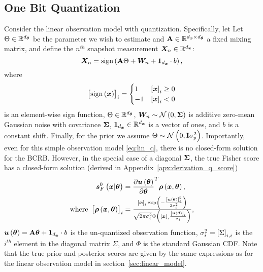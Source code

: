 {\subsection{%
{One Bit }Quantization}\label{sec:quantization_example}
Consider the linear observation model with quantization. %
{Specifically, let Let $\Theta\in\mathbb{R}^{{d_{\bm{\theta}}}}$ be the parameter %
{we wish to estimate} and $\mathbf{A}\in\mathbb{R}^{{{d_{\bm{x}}}}\times {d_{\bm{\theta}}}}$  a fixed mixing matrix, %
and define the  ${n}^{th}$ snapshot measurement ${\X}_{n}\in\mathbb{R}^{{\nx}}$:} %
\begin{equation}\label{eq:lin_q}
{\X}_{n}=\mathrm{sign}\brackets{\matsym{A}\pr+\randomvec{W}_{n}+\boldsymbol{1}_{\nx}\cdot b },
\end{equation}
where %
{$$\left[{\mathrm{sign}\left(\bm{x}\right)}\right]_i=\begin{cases}
    1 & \left[{\bm{x}}\right]_i\geq 0\\
    -1 & \left[{\bm{x}}\right]_i< 0
\end{cases}$$ is an element-wise sign function,} 
%
{ $\Theta \in \mathbb{R}^{{d_{\bm{\theta}}}}$,}
$\randomvec{W}_{n}\sim\normaldis{0}{\matsym{\Sigma}}$ is additive zero-mean Gaussian noise  with covariance %
$\mathbf{\Sigma}$, $\boldsymbol{1}_{{d_{\bm{x}}}} \in \mathbb{R}^{{d_{\bm{x}}}}$ is a vector of ones, %
and $b$ is a constant shift. Finally, for the prior
we assume $\Theta\sim\mathcal{N}\left(0,\mathbf{I}\sigma_p^2\right)$. 
Importantly, even for this simple observation model
\eqref{eq:lin_q}, there is no closed-form solution for the BCRB. However, in 
 the special case %
of a diagonal 
$\mathbf{\Sigma}$, 
the %
{true} {Fisher} score 
has a closed-form solution (derived in Appendix~\ref{apx:derivation_q_score})
\begin{align}\label{eq:score_quantization}
    \bm{s}^{0}_{F}\left(\bm{x}|\bm{\theta}\right)&=\frac{\partial\bm{u}\left(\bm{\theta}\right)}{\partial\bm{\theta}}^T\bm{\rho}\left(\bm{x},\bm{\theta}\right), \\
    \text{where } \left[{\bm{\rho}\left(\bm{x},\bm{\theta}\right)}\right]_i&=
    \textstyle{\frac{\left[{\bm{x}}\right]_i\exp\left(-\frac{\left[{\bm{u}\left(\bm{\theta}\right)}\right]_i^2}{2\sigma_i^2}\right)}{\sqrt{2\pi\sigma^2_i}\Phi\left(\left[{\bm{x}}\right]_i\frac{\left[{\bm{u}\left(\bm{\theta}\right)}\right]_i}{\sigma_i} \right)} } , \nonumber
\end{align}
$\bm{u}\left(\bm{\theta}\right)=\mathbf{A}\bm{\theta}+\boldsymbol{1}_{{d_{\bm{x}}}}\cdot b$ is the un-quantized observation function, $\sigma_i^2=\left[{\Sigma}\right]_{i,i}$ is the $i^{th}$ element in the diagonal matrix $\Sigma$, and
$\Phi$ is the 
standard Gaussian CDF. %
{Note that the true prior and posterior scores are 
given by the same expressions as for the linear observation model in section~\ref{sec:linear_model}.}

}
